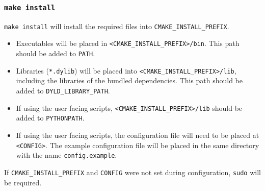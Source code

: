 \subsubsection{\texttt{make install}}
\texttt{make install} will install the required files into
\texttt{CMAKE\_INSTALL\_PREFIX}.
\begin{itemize}
  \item Executables will be placed in
    \texttt{<CMAKE\_INSTALL\_PREFIX>/bin}. This path should be added
    to \texttt{PATH}.
  \item Libraries (\texttt{*.dylib}) will be placed into
    \texttt{<CMAKE\_INSTALL\_PREFIX>/lib}, including the libraries of
    the bundled dependencies. This path should be added to
    \texttt{DYLD\_LIBRARY\_PATH}.
  \item If using the user facing scripts,
    \texttt{<CMAKE\_INSTALL\_PREFIX>/lib} should be added to
    \texttt{PYTHONPATH}.
  \item If using the user facing scripts, the configuration file will
    need to be placed at \texttt{<CONFIG>}. The example
    configuration file will be placed in the same directory with the
    name \texttt{config.example}.
\end{itemize}
If \texttt{CMAKE\_INSTALL\_PREFIX} and \texttt{CONFIG} were
not set during configuration, \texttt{sudo} will be required.

